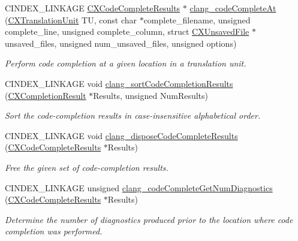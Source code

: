 \begin{DoxyCompactItemize}
C\+I\+N\+D\+E\+X\+\_\+\+L\+I\+N\+K\+A\+GE \hyperlink{structCXCodeCompleteResults}{C\+X\+Code\+Complete\+Results} $\ast$ \hyperlink{group__CINDEX__CODE__COMPLET_ga50fedfa85d8d1517363952f2e10aa3bf}{clang\+\_\+code\+Complete\+At} (\hyperlink{group__CINDEX_gacdb7815736ca709ce9a5e1ec2b7e16ac}{C\+X\+Translation\+Unit} TU, const char $\ast$complete\+\_\+filename, unsigned complete\+\_\+line, unsigned complete\+\_\+column, struct \hyperlink{structCXUnsavedFile}{C\+X\+Unsaved\+File} $\ast$unsaved\+\_\+files, unsigned num\+\_\+unsaved\+\_\+files, unsigned options)
\begin{DoxyCompactList}\small\item\em Perform code completion at a given location in a translation unit. \end{DoxyCompactList}\item 
C\+I\+N\+D\+E\+X\+\_\+\+L\+I\+N\+K\+A\+GE void \hyperlink{group__CINDEX__CODE__COMPLET_gaf2625ffd90004cf3202c7f9112eb3fe7}{clang\+\_\+sort\+Code\+Completion\+Results} (\hyperlink{structCXCompletionResult}{C\+X\+Completion\+Result} $\ast$Results, unsigned Num\+Results)
\begin{DoxyCompactList}\small\item\em Sort the code-\/completion results in case-\/insensitive alphabetical order. \end{DoxyCompactList}\item 
\mbox{\label{group__CINDEX__CODE__COMPLET_ga206cc6ea7be311537bb0fab584ebc6c1}} 
C\+I\+N\+D\+E\+X\+\_\+\+L\+I\+N\+K\+A\+GE void \hyperlink{group__CINDEX__CODE__COMPLET_ga206cc6ea7be311537bb0fab584ebc6c1}{clang\+\_\+dispose\+Code\+Complete\+Results} (\hyperlink{structCXCodeCompleteResults}{C\+X\+Code\+Complete\+Results} $\ast$Results)
\begin{DoxyCompactList}\small\item\em Free the given set of code-\/completion results. \end{DoxyCompactList}\item 
\mbox{\label{group__CINDEX__CODE__COMPLET_ga0cce4aff990ed511c1878a23c57e87fa}} 
C\+I\+N\+D\+E\+X\+\_\+\+L\+I\+N\+K\+A\+GE unsigned \hyperlink{group__CINDEX__CODE__COMPLET_ga0cce4aff990ed511c1878a23c57e87fa}{clang\+\_\+code\+Complete\+Get\+Num\+Diagnostics} (\hyperlink{structCXCodeCompleteResults}{C\+X\+Code\+Complete\+Results} $\ast$Results)
\begin{DoxyCompactList}\small\item\em Determine the number of diagnostics produced prior to the location where code completion was performed. \end{DoxyCompactList}\item 

\end{DoxyCompactItemize}
